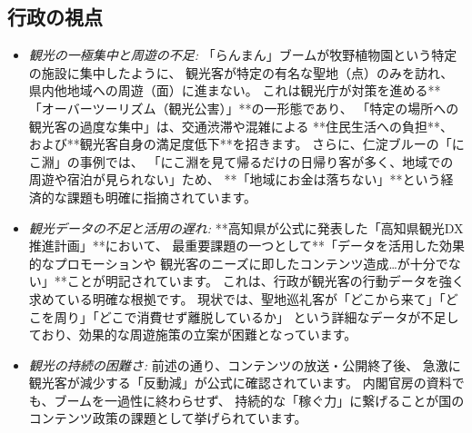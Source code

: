 \documentclass{docs}
\begin{document}
\subsection{行政の視点}
\begin{itemize}
\item \emph{観光の一極集中と周遊の不足:}
    「らんまん」ブームが牧野植物園という特定の施設に集中したように、
    観光客が特定の有名な聖地（点）のみを訪れ、県内他地域への周遊（面）に進まない。
    これは観光庁が対策を進める**「オーバーツーリズム（観光公害）」**の一形態\cite{jalan_overtourism, kanko_overtourism}であり、
    「特定の場所への観光客の過度な集中」は、交通渋滞や混雑による
    **住民生活への負担**、および**観光客自身の満足度低下**を招きます。
    さらに、仁淀ブルーの「にこ淵」の事例\cite{nikobuchi_mlit}では、
    「にこ淵を見て帰るだけの日帰り客が多く、地域での周遊や宿泊が見られない」ため、
    **「地域にお金は落ちない」**という経済的な課題も明確に指摘されています。

    \item \emph{観光データの不足と活用の遅れ:}
    **高知県が公式に発表した「高知県観光DX推進計画」**\cite{kochi_dx_plan}において、
    最重要課題の一つとして**「データを活用した効果的なプロモーションや
    観光客のニーズに即したコンテンツ造成…が十分でない」**ことが明記されています。
    これは、行政が観光客の行動データを強く求めている明確な根拠です。
    現状では、聖地巡礼客が「どこから来て」「どこを周り」「どこで消費せず離脱しているか」
    という詳細なデータが不足しており、効果的な周遊施策の立案が困難となっています。

    \item \emph{観光の持続の困難さ:}
    前述の通り、コンテンツの放送・公開終了後、
    急激に観光客が減少する「反動減」が公式に確認されています\cite{kochi_r7_plan}。
    内閣官房の資料\cite{cas_kadokawa}でも、ブームを一過性に終わらせず、
    持続的な「稼ぐ力」に繋げることが国のコンテンツ政策の課題として挙げられています。
\end{itemize}
\end{document}
